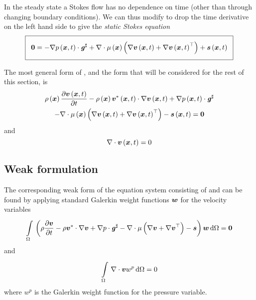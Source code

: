 In the steady state a Stokes flow has no dependence on time (other than
through changing boundary conditions). We can thus modify
 to drop the time derivative on the left
hand side to give the \emph{static Stokes equation} \ie
\begin{equation}
  \addtolength{\fboxsep}{5pt}
  \boxed{
    \vectr{0}=\dotprod{-\gradient{}{\fnof{p}{\vectr{x},t}}}{\sharptensor{\tensor{g}}}
    +\divergence{}{\fnof{\mu}{\vectr{x}}\pbrac{\gradient{}{\fnof{\vectr{v}}{\vectr{x},t}+
          \transpose{\gradient{}{\fnof{\vectr{v}}{\vectr{x},t}}}}}}
    +\fnof{\vectr{s}}{\vectr{x},t}
  }
  \label{eqn:StokesEquationStaticMomentum}
\end{equation}

The most general form of
, and
the form that will be considered for the rest of this section, is
\begin{multline}
  \fnof{\rho}{\vectr{x}}\delby{\fnof{\vectr{v}}{\vectr{x},t}}{t}
  -\fnof{\rho}{\vectr{x}}\dotprod{\fnof{\vectr{v}^{*}}{\vectr{x},t}}{
    \gradient{}{\fnof{\vectr{v}}{\vectr{x},t}}}
  +\dotprod{\gradient{}{\fnof{p}{\vectr{x},t}}}{\sharptensor{\tensor{g}}}\\
  -\divergence{}{\fnof{\mu}{\vectr{x}}\pbrac{\gradient{}{\fnof{\vectr{v}}{\vectr{x},t}+
        \transpose{\gradient{}{\fnof{\vectr{v}}{\vectr{x},t}}}}}}
  -\fnof{\vectr{s}}{\vectr{x},t}=\vectr{0}
  \label{eqn:StokesEquationGenMomentum}
\end{multline}
and
\begin{equation}
  \divergence{}{\fnof{\vectr{v}}{\vectr{x},t}}=0
  \label{eqn:StokesEquationGenMass}
\end{equation}

\subsection{Weak formulation}

The corresponding weak form of the equation system consisting of
 and 
can be found by applying standard Galerkin weight functions $ \boldsymbol{w} $ for
the velocity variables \ie
\begin{equation}
  \gint{\Omega}{}{\pbrac{\rho\delby{\vectr{v}}{t}-\rho\dotprod{\vectr{v}^{*}}{\gradient{}{\vectr{v}}}
      +\dotprod{\gradient{}{p}}{\sharptensor{\tensor{g}}}
      -\divergence{}{\mu\pbrac{\gradient{}{\vectr{v}+\transpose{\gradient{}{\vectr{v}}}}}}
      -\vectr{s}}{\vectr{w}}}{\Omega} = \vectr{0}
  \label{eqn:WeakFormStokesGenMomentum}
\end{equation}
and 
\begin{equation}
  \gint{\Omega}{}{\divergence{}{\vectr{v}}w^{p}}{\Omega} = 0
 \label{eqn:WeakFormStokesGenMass}
\end{equation}
where $w^{p}$ is the Galerkin weight function for the pressure variable.

